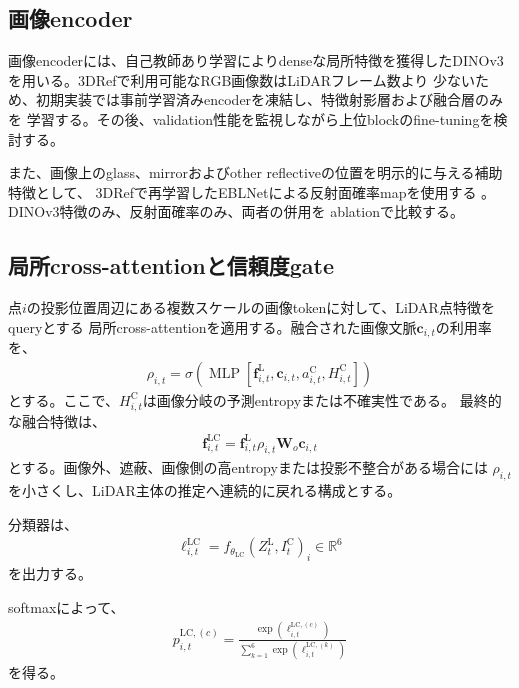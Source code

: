 \documentclass[uplatex,a4paper,11pt]{jsarticle}
\begin{document}
\subsection{画像encoder}

画像encoderには、自己教師あり学習によりdenseな局所特徴を獲得したDINOv3
\cite{simeoni2025_dinov3}を用いる。3DRefで利用可能なRGB画像数はLiDARフレーム数より
少ないため、初期実装では事前学習済みencoderを凍結し、特徴射影層および融合層のみを
学習する。その後、validation性能を監視しながら上位blockのfine-tuningを検討する。

また、画像上のglass、mirrorおよびother reflectiveの位置を明示的に与える補助特徴として、
3DRefで再学習したEBLNetによる反射面確率mapを使用する
\cite{he2021_eblnet,zhao2024_3dref}。DINOv3特徴のみ、反射面確率のみ、両者の併用を
ablationで比較する。

\subsection{局所cross-attentionと信頼度gate}

点$i$の投影位置周辺にある複数スケールの画像tokenに対して、LiDAR点特徴をqueryとする
局所cross-attentionを適用する。融合された画像文脈$\bm{c}_{i,t}$の利用率を、
\begin{align}
  \rho_{i,t}
  =
  \sigma
  \left(
    \operatorname{MLP}
    \left[
      \bm{f}_{i,t}^{\mathrm{L}},
      \bm{c}_{i,t},
      a_{i,t}^{\mathrm{C}},
      H_{i,t}^{\mathrm{C}}
    \right]
  \right)
\end{align}
とする。ここで、$H_{i,t}^{\mathrm{C}}$は画像分岐の予測entropyまたは不確実性である。
最終的な融合特徴は、
\begin{align}
  \bm{f}_{i,t}^{\mathrm{LC}}
  =
  \bm{f}_{i,t}^{\mathrm{L}}
  \rho_{i,t}
  \bm{W}_{o}\bm{c}_{i,t}
\end{align}
とする。画像外、遮蔽、画像側の高entropyまたは投影不整合がある場合には
$\rho_{i,t}$を小さくし、LiDAR主体の推定へ連続的に戻れる構成とする。

分類器は、
\begin{align}
  \bm{\ell}_{i,t}^{\mathrm{LC}}
  =
  f_{\theta_{\mathrm{LC}}}
  \left(
    Z_t^{\mathrm{L}},
    I_t^{\mathrm{C}}
  \right)_i
  \in
  \mathbb{R}^{6}
\end{align}
を出力する。

softmaxによって、
\begin{align}
  p_{i,t}^{\mathrm{LC},(c)}
  =
  \frac{
    \exp
    \left(
      \ell_{i,t}^{\mathrm{LC},(c)}
    \right)
  }{
    \sum_{k=1}^{6}
    \exp
    \left(
      \ell_{i,t}^{\mathrm{LC},(k)}
    \right)
  }
\end{align}
を得る。
\end{document}
